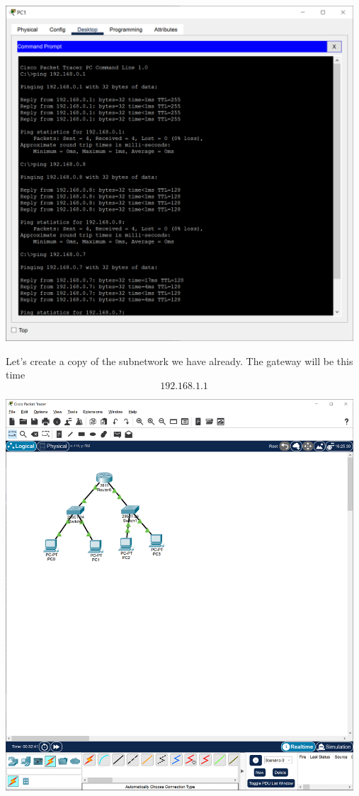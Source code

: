 \documentclass[a4paper,12pt]{book}
\begin{document}
\noindent \includegraphics[width=13cm]{./step-by-step/18.PNG}
\clearpage

\noindent Let's create a copy of the subnetwork we have already. The gateway will be this time 
\[192.168.1.1\] \newline
 
\noindent \includegraphics[width=13cm]{./step-by-step/19.PNG}
\clearpage
\end{document}

